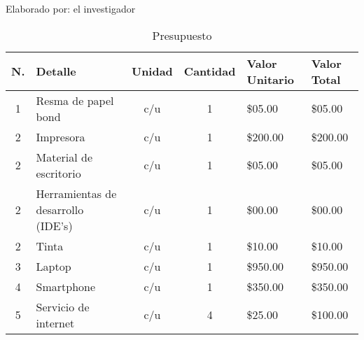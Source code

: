 \begin{ThreePartTable}
	\begin{TableNotes}[flushleft]
		\centering
		\item Elaborado por: el investigador
	\end{TableNotes}
	\begin{longtable}{c p{} c c p{} p{}}
		\caption{Presupuesto}
		\label{table:presupuesto}                                                                                                                                                   \\
		\toprule
		\textbf{N.}                                     & \textbf{Detalle}                   & \textbf{Unidad} & \textbf{Cantidad} & \textbf{Valor Unitario} & \textbf{Valor Total} \\
		\midrule
		1                                               & Resma de papel bond                & c/u             & 1                 & \$05.00                 & \$05.00              \\
		2                                               & Impresora                          & c/u             & 1                 & \$200.00                & \$200.00             \\
		2                                               & Material de escritorio             & c/u             & 1                 & \$05.00                 & \$05.00              \\
		2                                               & Herramientas de desarrollo (IDE's) & c/u             & 1                 & \$00.00                 & \$00.00              \\
		2                                               & Tinta                              & c/u             & 1                 & \$10.00                 & \$10.00              \\
		3                                               & Laptop                             & c/u             & 1                 & \$950.00                & \$950.00             \\
		4                                               & Smartphone                         & c/u             & 1                 & \$350.00                & \$350.00             \\
		5                                               & Servicio de internet               & c/u             & 4                 & \$25.00                 & \$100.00             \\

\end{longtable}
\end{ThreePartTable}
